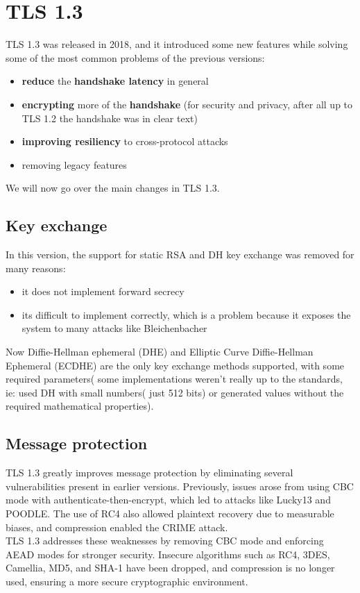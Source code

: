 \section{TLS 1.3}
TLS 1.3 was released in 2018, and it introduced some new features
while solving some of the most common problems of the previous 
versions:
\begin{itemize}
  \item \textbf{reduce} the \textbf{handshake latency} in general 
  \item \textbf{encrypting} more of the \textbf{handshake} (for
    security and privacy, after all up to TLS 1.2 the handshake was in
    clear text)
  \item \textbf{improving resiliency} to cross-protocol attacks
  \item removing legacy features
\end{itemize}
We will now go over the main changes in TLS 1.3.

\subsection{Key exchange}
In this version, the support for static RSA and DH key exchange was
removed for many reasons:
\begin{itemize}
  \item it does not implement forward secrecy 
  \item its difficult to implement correctly, which is a problem
    because it exposes the system to many attacks like Bleichenbacher
\end{itemize}
Now Diffie-Hellman ephemeral (DHE) and Elliptic Curve Diffie-Hellman
Ephemeral (ECDHE) are the only key exchange methods supported, with
some required parameters( some implementations weren't really up to
the standards, ie: used DH with small numbers( just 512 bits) or
generated values without the required mathematical properties).

\subsection{Message protection}
TLS 1.3 greatly improves message protection by eliminating several
vulnerabilities present in earlier versions. Previously, issues arose
from using CBC mode with authenticate-then-encrypt, which led to
attacks like Lucky13 and POODLE. The use of RC4 also allowed plaintext
recovery due to measurable biases, and compression enabled the CRIME
attack.\\
TLS 1.3 addresses these weaknesses by removing CBC mode and enforcing
AEAD modes for stronger security. Insecure algorithms such as RC4,
3DES, Camellia, MD5, and SHA-1 have been dropped, and compression is
no longer used, ensuring a more secure cryptographic environment.

